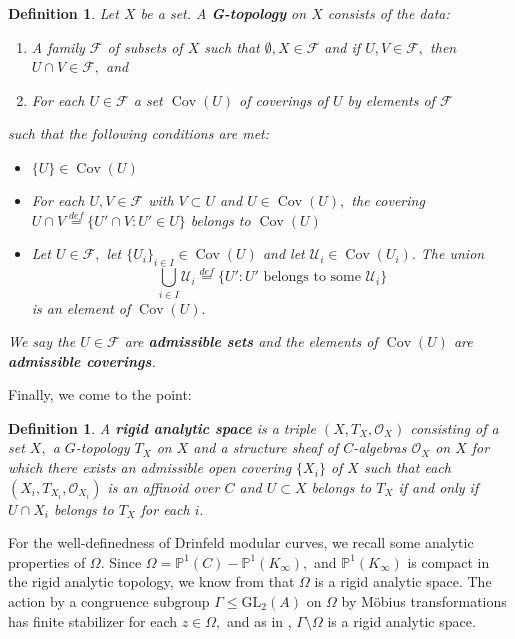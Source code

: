 \documentclass[11pt]{amsart}
\newtheorem{definition}[theorem]{Definition}
\theoremstyle{definition}
\numberwithin{equation}{section}
\newcommand{\GL}{\mathrm{GL}} 	%
\newcommand{\cO}{\mathcal{O}}		%
\newcommand{\cU}{\mathcal{U}}		%
\newcommand{\sF}{\mathscr{F}}		%
\newcommand{\bbP}{\mathbb{P}}		%
\begin{document}
		\begin{definition}\cite[Definition $2.4.1$]{Frensel-vanderPut-Rigid-Analytic_Geom}
			Let $X$ be a set. A \textbf{G-topology} on $X$ consists of the data:
			\begin{enumerate}
				\item A family $\sF$ of subsets of $X$ such that $\emptyset, X\in \sF$ and if $U,V\in \sF,$ then $U\cap V\in \sF,$ and 
				\item For each $U\in \sF$ a set $\operatorname{Cov}(U)$ of coverings of $U$ by elements of $\sF$
			\end{enumerate}
			such that the following conditions are met:
			\begin{itemize}
				\item $\{U\}\in \operatorname{Cov}(U)$
				\item For each $U,V\in \sF$ with $V\subset U$ and $U\in \operatorname{Cov}(U),$ the covering $\displaystyle{U\cap V\overset{def}{=}\{U'\cap V: U'\in U\}}$ belongs to $\operatorname{Cov}(U)$
				\item Let $U\in \sF,$ let $\{U_i\}_{i\in I}\in \operatorname{Cov}(U)$ and let $\cU_i\in \operatorname{Cov}(U_i).$ The union \[\bigcup_{i\in I} \cU_i\overset{def}{=}\{U':U'\text{ belongs to some }\cU_i \}\] is an element of $\operatorname{Cov}(U).$
			\end{itemize}
			We say the $U\in \sF$ are \textbf{admissible sets} and the elements of $\operatorname{Cov}(U)$ are \textbf{admissible coverings}.
		\end{definition}
		
		Finally, we come to the point:
		\begin{definition}\cite[Definition $4.3.1$]{Frensel-vanderPut-Rigid-Analytic_Geom}
			A \textbf{rigid analytic space} is a triple $(X,T_X,\cO_X)$ consisting of a set $X,$ a $G$-topology $T_X$ on $X$ and a structure sheaf of $C$-algebras $\cO_X$ on $X$ for which there exists an admissible open covering $\{X_i\}$ of $X$ such that each $(X_i,T_{X_i},\cO_{X_i})$ is an affinoid over $C$ and $U\subset X$ belongs to $T_X$ if and only if $U\cap X_i$ belongs to $T_X$ for each $i.$ 
		\end{definition}
		
		For the well-definedness of Drinfeld modular curves, we recall some analytic properties of $\Omega.$
		Since $\Omega=\bbP^1(C)-\bbP^1(K_{\infty}),$ and $\bbP^1(K_{\infty})$ is compact in the rigid analytic topology, we know from \cite[Section $1.2$]{Gekeler-jacobians} that $\Omega$ is a rigid analytic space. The action by  a congruence subgroup $\Gamma\leq \GL_2(A)$ on $\Omega$ by M\"obius transformations has finite stabilizer for each $z\in \Omega,$ and as in \cite[Sections $(2.5)$ and $(2.6)$]{Gekeler-jacobians}, $\Gamma\setminus \Omega$ is a rigid analytic space.\\
		
\end{document}
